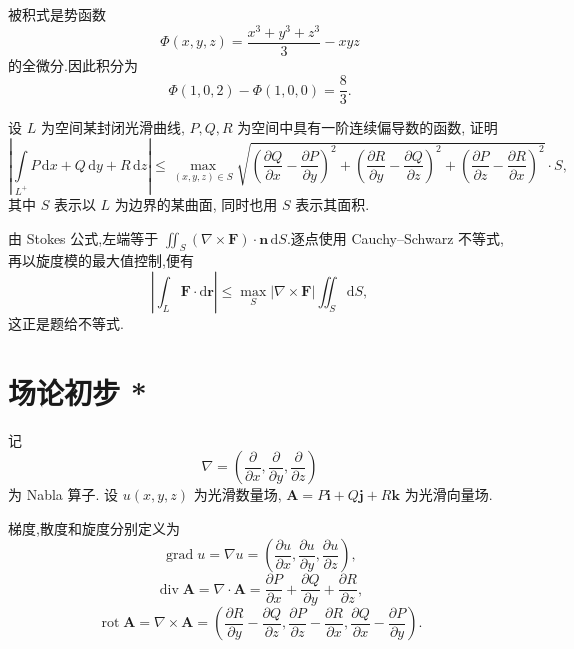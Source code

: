 \begin{solution}
    被积式是势函数
    \[
        \Phi(x,y,z)=\dfrac{x^3+y^3+z^3}{3}-xyz
    \]
    的全微分.因此积分为
    \[
        \Phi(1,0,2)-\Phi(1,0,0)=\dfrac{8}{3}.
    \]
\end{solution}

\begin{example}
    设 $L$ 为空间某封闭光滑曲线, $P,Q,R$ 为空间中具有一阶连续偏导数的函数, 证明
    \[
        \left|\int\limits_{L^+}P\,\mathrm{d}x+Q\,\mathrm{d}y+R\,\mathrm{d}z\right|
        \leq
        \max_{(x,y,z)\in S}
        \sqrt{
            \left(\dfrac{\partial Q}{\partial x}-\dfrac{\partial P}{\partial y}\right)^2+
            \left(\dfrac{\partial R}{\partial y}-\dfrac{\partial Q}{\partial z}\right)^2+
            \left(\dfrac{\partial P}{\partial z}-\dfrac{\partial R}{\partial x}\right)^2}
        \cdot S,
    \]
    其中 $S$ 表示以 $L$ 为边界的某曲面, 同时也用 $S$ 表示其面积.
\end{example}
\exampleblank

\begin{solution}
    由 Stokes 公式,左端等于 $\displaystyle\iint_S(\nabla\times\bm F)\cdot\bm n\,\mathrm{d}S$.逐点使用 Cauchy--Schwarz 不等式,再以旋度模的最大值控制,便有
    \[
        \left|\int_L\bm F\cdot\mathrm{d}\bm r\right|
        \leq\max_S|\nabla\times\bm F|\iint_S\mathrm{d}S,
    \]
    这正是题给不等式.
\end{solution}


\newpage

\section{场论初步 *}

记
\[
    \nabla=\left(\dfrac{\partial}{\partial x},\dfrac{\partial}{\partial y},\dfrac{\partial}{\partial z}\right)
\]
为 Nabla 算子. 设 $u(x,y,z)$ 为光滑数量场, $\bm A=P\bm i+Q\bm j+R\bm k$ 为光滑向量场.

\begin{definition}
    梯度,散度和旋度分别定义为
    \[
        \operatorname{grad}u=\nabla u
        =\left(\dfrac{\partial u}{\partial x},\dfrac{\partial u}{\partial y},\dfrac{\partial u}{\partial z}\right),
    \]
    \[
        \operatorname{div}\bm A=\nabla\cdot\bm A
        =\dfrac{\partial P}{\partial x}+\dfrac{\partial Q}{\partial y}+\dfrac{\partial R}{\partial z},
    \]
    \[
        \operatorname{rot}\bm A=\nabla\times\bm A
        =\left(
        \dfrac{\partial R}{\partial y}-\dfrac{\partial Q}{\partial z},
        \dfrac{\partial P}{\partial z}-\dfrac{\partial R}{\partial x},
        \dfrac{\partial Q}{\partial x}-\dfrac{\partial P}{\partial y}
        \right).
    \]
\end{definition}

